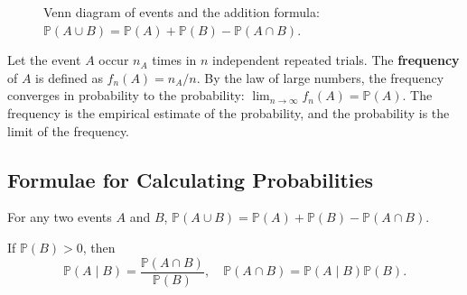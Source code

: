\begin{figure}[htbp]
\centering
{}
\caption{Venn diagram of events and the addition formula: $\mathbb{P}(A\cup B)=\mathbb{P}(A)+\mathbb{P}(B)-\mathbb{P}(A\cap B)$.}
\label{fig:venn_diagram}
\end{figure}

\begin{definition}\label{def:frequency_probability}
Let the event $A$ occur $n_A$ times in $n$ independent repeated trials. The \textbf{frequency} of $A$ is defined as $f_n(A) = n_A / n$. By the law of large numbers, the frequency converges in probability to the probability: $\lim_{n \to \infty} f_n(A) = \mathbb{P}(A)$. The frequency is the empirical estimate of the probability, and the probability is the limit of the frequency.
\end{definition}

\subsection{Formulae for Calculating Probabilities}

\begin{definition}\label{def:addition_rule}
For any two events $A$ and $B$, $\mathbb{P}(A \cup B) = \mathbb{P}(A) + \mathbb{P}(B) - \mathbb{P}(A \cap B)$.
\end{definition}

\begin{definition}\label{def:conditional_multiplication}
If $\mathbb{P}(B) > 0$, then
\[
\mathbb{P}(A \mid B) = \frac{\mathbb{P}(A \cap B)}{\mathbb{P}(B)}, \quad \mathbb{P}(A \cap B) = \mathbb{P}(A \mid B) \mathbb{P}(B).
\]
\end{definition}

